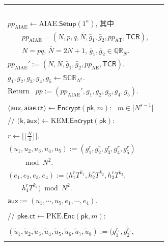 {\renewcommand{\baselinestretch}{1.2} \normalsize
\begin{figure}[!h]
\centering
{\begin{tabular}{|l|l|}
\hline
~\makecell[l]{
\underline{$pp \leftarrow \textsf{Setup}(1^\kappa)$:}  \\
{$pp_{\text{AIAE}} \leftarrow \text{AIAE}.\mathsf{Setup}(1^\kappa)$, 其中} \\
{~~~~$pp_{\text{AIAE}} = (N,  p, q, \bar{N}, \bar{g}_1, \bar{g}_2, pp_{\text{AT}}, {\mathsf{TCR}})$,} \\
{~~~~$N = p q$, $\bar{N} = 2 N + 1$, $\bar{g}_{1}, \bar{g}_{2} \in \mathbb{QR}_{\bar{N}}$.} \\
{$pp_{\text{AIAE}}' := (N, \bar{N}, \bar{g}_1, \bar{g}_2, pp_{\text{AE}}, {\mathsf{TCR}})$.} \\
$g_1, g_2, g_3, g_4, g_5 \leftarrow \mathbb{SCR}_{N^s}$. \\
{Return~ $pp := (pp_{\text{AIAE}}', g_1, g_2, g_3, g_4, g_5 )$.} \\
\vspace{-5pt} \\
\underline{$\langle {\mathsf{aux}}, \mathsf{aiae.ct} \rangle \leftarrow \mathsf{Encrypt}(\mathsf{pk}, m)$:} ~$m \in \big[ N^{s-1} \big]$ \\
// $\big(\mathsf{k}, \mathsf{aux} \big) \leftarrow \text{KEM}.\mathsf{Encrypt}(\mathsf{pk})$: \\
\grabox{\makecell[l]{
$\mathsf{k} = (k_1, k_2, k_3, k_4) \sample (\mathbb{Z}_{N})^4$. \\
$r \leftarrow \big[ \big\lfloor \frac{N}{4} \big\rfloor \big]$. \\
$(u_1, u_2, u_3, u_4, u_5) := (g_1^{r}, g_2^{r}, g_3^{r}, g_4^{r}, g_5^{r})$ \\
~~~~$\bmod N^2$. \\
$(e_1, e_2, e_3, e_4) := (h_1^{r} T^{k_1}, h_2^{r} T^{k_2}, h_3^{r} T^{k_3},$ \\
~~~~$h_4^{r} T^{k_4}) \bmod N^2$. \\
$\mathsf{aux} := (u_1, \cdots, u_5, e_1, \cdots, e_4)$. \\ }~~~} \\
// $\mathsf{pke.ct} \leftarrow \text{PKE}.\mathsf{Enc}(\mathsf{pk}, m)$: \\
\grabox{\makecell[l]{
$\tilde{r}_1, \tilde{r}_2, \tilde{r}_3, \tilde{r}_4 \sample \big[ \big\lfloor \frac{N}{4} \big\rfloor \big]$. \\
$(\tilde{u}_1, \tilde{u}_2, \tilde{u}_3, \tilde{u}_4, \tilde{u}_5, \tilde{u}_6, \tilde{u}_7, \tilde{u}_8) := (g_1^{\tilde{r}_1}, g_2^{\tilde{r}_1},$ \\
}}}
\end{tabular}}
\end{figure}}
